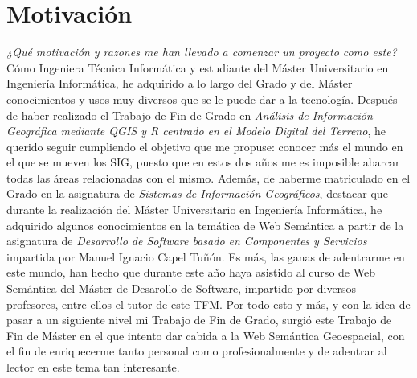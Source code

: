 \section{Motivación}


\textit{¿Qué motivación y razones me han llevado a comenzar un proyecto como este?} Cómo Ingeniera Técnica Informática y estudiante del Máster Universitario en Ingeniería Informática, he adquirido a lo largo del Grado y del Máster conocimientos y usos muy diversos que se le puede dar a la tecnología. Después de haber realizado el Trabajo de Fin de Grado en \textit{Análisis de Información Geográfica mediante QGIS y R centrado en el Modelo Digital del Terreno}, he querido seguir cumpliendo el objetivo que me propuse: conocer más el mundo en el que se mueven los SIG, puesto que en estos dos años me es imposible abarcar todas las áreas relacionadas con el mismo. Además, de haberme matriculado en el Grado en la asignatura de \textit{Sistemas de Información Geográficos}, destacar que durante la realización del Máster Universitario en Ingeniería Informática, he adquirido algunos conocimientos en la temática de Web Semántica a partir de la asignatura de \textit{Desarrollo de Software basado en Componentes y Servicios} impartida por Manuel Ignacio Capel Tuñón. Es más, las ganas de adentrarme en este mundo, han hecho que durante este año haya asistido al curso de Web Semántica del Máster de Desarollo de Software, impartido por diversos profesores, entre ellos el tutor de este TFM. Por todo esto y más, y con la idea de pasar a un siguiente nivel mi Trabajo de Fin de Grado, surgió este Trabajo de Fin de Máster en el que intento dar cabida a la Web Semántica Geoespacial, con el fin de enriquecerme tanto personal como profesionalmente y de adentrar al lector en este tema tan interesante.\\ 



